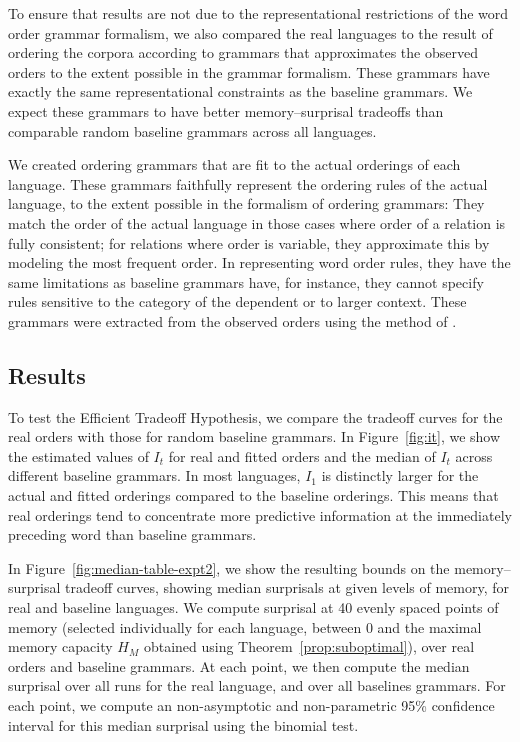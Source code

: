 To ensure that results are not due to the representational restrictions of the word order grammar formalism, we also compared the real languages to the result of ordering the corpora according to grammars that approximates the observed orders to the extent possible in the grammar formalism.
These grammars have exactly the same representational constraints as the baseline grammars.
We expect these grammars to have better memory--surprisal tradeoffs than comparable random baseline grammars across all languages.

We created ordering grammars that are fit to the actual orderings of each language.
These grammars faithfully represent the ordering rules of the actual language, to the extent  possible in the formalism of ordering grammars:
They match the order of the actual language in those cases where order of a relation is fully consistent; for relations where order is variable, they approximate this by modeling the most frequent order.
In representing word order rules, they have the same limitations as baseline grammars have, for instance, they cannot specify rules sensitive to the category of the dependent or to larger context.
These grammars were extracted from the observed orders using the method of \cite{hahn2020universals}.


\subsection{Results}\label{sec:main-experiment-results}
To test the Efficient Tradeoff Hypothesis, we compare the tradeoff curves for the real orders with those for random baseline grammars.
In Figure~\ref{fig:it}, we show the estimated values of $I_t$ for real and fitted orders and the median of $I_t$ across different baseline grammars.
In most languages, $I_1$ is distinctly larger for the actual and fitted orderings compared to the baseline orderings. This means that real orderings tend to concentrate more predictive information at the immediately preceding word than baseline grammars.

In Figure~\ref{fig:median-table-expt2}, we show the resulting bounds on the memory--surprisal tradeoff curves, showing median surprisals at given levels of memory, for real and baseline languages.
We compute surprisal at 40 evenly spaced points of memory (selected individually for each language, between 0 and the maximal memory capacity $H_M$ obtained using Theorem~\ref{prop:suboptimal}), over real orders and baseline grammars.
At each point, we then compute the median surprisal over all runs for the real language, and over all baselines grammars.
For each point, we compute an non-asymptotic and non-parametric 95\% confidence interval for this median surprisal using the binomial test.

